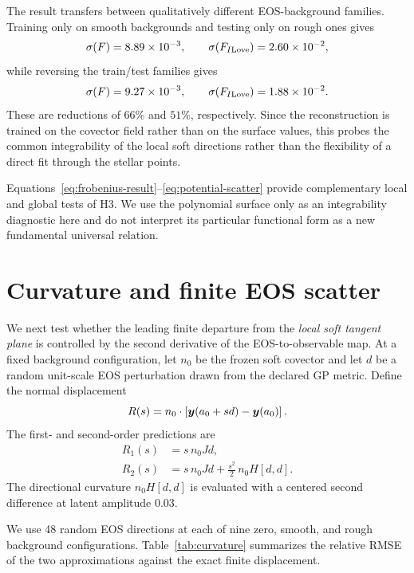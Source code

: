 The result transfers between qualitatively different EOS-background
families.  Training only on smooth backgrounds and testing only on rough
ones gives
\[
    \sigma(F)=8.89\times10^{-3},
    \qquad
    \sigma(F_{I{\rm Love}})=2.60\times10^{-2},
\]
while reversing the train/test families gives
\[
    \sigma(F)=9.27\times10^{-3},
    \qquad
    \sigma(F_{I{\rm Love}})=1.88\times10^{-2}.
\]
These are reductions of \(66\%\) and \(51\%\), respectively.  Since the
reconstruction is trained on the covector field rather than on the surface
values, this probes the common integrability of the local soft directions
rather than the flexibility of a direct fit through the stellar points.

Equations~\eqref{eq:frobenius-result}--\eqref{eq:potential-scatter}
provide complementary local and global tests of H3.  We use the polynomial
surface only as an integrability diagnostic here and do not interpret its
particular functional form as a new fundamental universal relation.

\section{Curvature and finite EOS scatter}
\label{sec:curvature}

We next test whether the leading finite departure from the \emph{local soft
tangent plane} is controlled by the second derivative of the
EOS-to-observable map.  At a fixed background configuration, let \(n_0\) be
the frozen soft covector and let \(d\) be a random unit-scale EOS
perturbation drawn from the declared GP metric.  Define the normal displacement
\begin{equation}
    R(s)
    =
    n_0\cdot
    \left[
      \bm{y}(a_0+s d)-\bm{y}(a_0)
    \right].
\end{equation}
The first- and second-order predictions are
\begin{align}
    R_1(s)
    &=
    s\,n_0 J d,
    \\
    R_2(s)
    &=
    s\,n_0 J d
    +
    \frac{s^2}{2}\,
    n_0 H[d,d].
    \label{eq:curvature-prediction}
\end{align}
The directional curvature \(n_0H[d,d]\) is evaluated with a centered
second difference at latent amplitude \(0.03\).

We use 48 random EOS directions at each of nine zero, smooth, and rough
background configurations.  Table~\ref{tab:curvature} summarizes the
relative RMSE of the two approximations against the exact finite
displacement.

